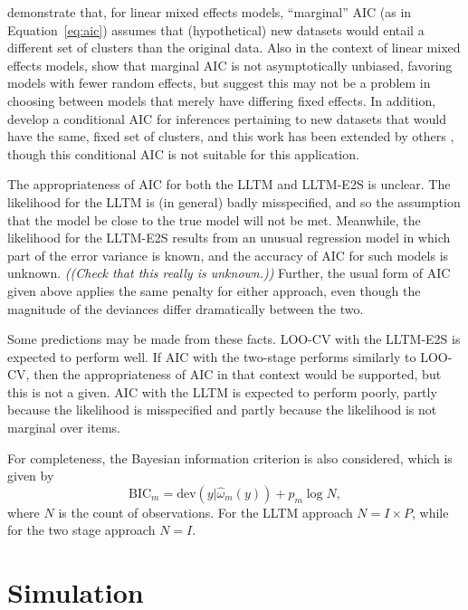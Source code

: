 \textcite{Vaida2005} demonstrate that, for linear mixed effects models, ``marginal'' AIC (as in Equation~\ref{eq:aic}) assumes that (hypothetical) new datasets would entail a different set of clusters than the original data. Also in the context of linear mixed effects models, \textcite{Greven2010} show that marginal AIC is not asymptotically unbiased, favoring models with fewer random effects, but suggest this may not be a problem in choosing between models that merely have differing fixed effects. In addition, \textcite{Vaida2005} develop a conditional AIC for inferences pertaining to new datasets that would have the same, fixed set of clusters, and this work has been extended by others \parencite{Liang2008, Greven2010, yu2012conditional, yu2013information, saefken2014unifying}, though this conditional AIC is not suitable for this application.

The appropriateness of AIC for both the LLTM and LLTM-E2S is unclear. The likelihood for the LLTM is (in general) badly misspecified, and so the assumption that the model be close to the true model will not be met. Meanwhile, the likelihood for the LLTM-E2S results from an unusual regression model in which part of the error variance is known, and the accuracy of AIC for such models is unknown. \emph{((Check that this really is unknown.))} Further, the usual form of AIC given above applies the same penalty for either approach, even though the magnitude of the deviances differ dramatically between the two.

Some predictions may be made from these facts. LOO-CV with the LLTM-E2S is expected to perform well. If AIC with the two-stage performs similarly to LOO-CV, then the appropriateness of AIC in that context would be supported, but this is not a given. AIC with the LLTM is expected to perform poorly, partly because the likelihood is misspecified and partly because the likelihood is not marginal over items.

For completeness, the Bayesian information criterion \parencite[BIC;][]{schwarz1978estimating} is also considered, which is given by
\begin{equation}
	\mathrm{BIC}_m = \mathrm{dev}(y | \hat \omega_m(y)) + p_m \log N
,\end{equation}
where $N$ is the count of observations. For the LLTM approach $N = I \times P$, while for the two stage approach $N = I$.


\section{Simulation}

